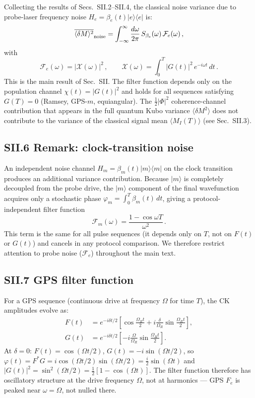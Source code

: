 \documentclass[aps,pra,twocolumn,superscriptaddress,longbibliography]{revtex4-2}
\newcommand{\be}{\begin{equation}}
\newcommand{\ee}{\end{equation}}
\begin{document}
Collecting the results of Secs.~SII.2--SII.4, the classical noise variance due to
probe-laser frequency noise $H_e = \beta_e(t)|e\rangle\langle e|$ is:
\be
  \overline{\langle\delta M\rangle^2}_{\rm noise}
  = \int_{-\infty}^{\infty}\frac{d\omega}{2\pi}\,
    S_{\beta_e}(\omega)\,\mathcal{F}_e(\omega)\,,
  \label{eq:full_var_supp}
\ee
with
\be
  \boxed{\mathcal{F}_e(\omega) = |\mathcal{X}(\omega)|^2\,,
  \qquad \mathcal{X}(\omega) = \int_0^T|G(t)|^2\,e^{-i\omega t}\,dt\,.}
  \label{eq:Fe_3level_supp}
\ee
This is the main result of Sec.~SII.
The filter function depends only on the population channel $\chi(t)=|G(t)|^2$
and holds for all sequences satisfying $G(T)=0$ (Ramsey, GPS-$m$, equiangular).
The $\tfrac{1}{2}|\Phi|^2$ coherence-channel contribution that appears in the
full quantum Kubo variance $\langle\delta M^2\rangle$ does not contribute to the
variance of the classical signal mean $\langle M_I(T)\rangle$ (see Sec.~SII.3).

\subsection*{SII.6 Remark: clock-transition noise}

An independent noise channel $H_m = \beta_m(t)|m\rangle\langle m|$ on the clock
transition produces an additional variance contribution.
Because $|m\rangle$ is completely decoupled from the probe drive, the
$|m\rangle$ component of the final wavefunction acquires only a stochastic phase
$\varphi_m = \int_0^T\!\beta_m(t)\,dt$, giving a protocol-independent filter function
\be
  \mathcal{F}_m(\omega) = \frac{1-\cos\omega T}{\omega^2}\,.
  \label{eq:Fm_supp}
\ee
This term is the same for all pulse sequences (it depends only on $T$, not on $F(t)$
or $G(t)$) and cancels in any protocol comparison.
We therefore restrict attention to probe noise ($\mathcal{F}_e$) throughout the main text.

\subsection*{SII.7 GPS filter function}

For a GPS sequence (continuous drive at frequency $\Omega$ for time $T$), the CK
amplitudes evolve as:
\begin{align}
  F(t) &= e^{-i\delta t/2}\!\left[\cos\!\tfrac{\Omega_R t}{2}
           + i\tfrac{\delta}{\Omega_R}\sin\!\tfrac{\Omega_R t}{2}\right], \\
  G(t) &= e^{-i\delta t/2}\!\left[-i\tfrac{\Omega}{\Omega_R}\sin\!\tfrac{\Omega_R t}{2}\right].
\end{align}
At $\delta = 0$: $F(t) = \cos(\Omega t/2)$, $G(t) = -i\sin(\Omega t/2)$, so
$\varphi(t) = F^*G = i\cos(\Omega t/2)\sin(\Omega t/2) = \tfrac{i}{2}\sin(\Omega t)$
and $|G(t)|^2 = \sin^2(\Omega t/2) = \tfrac{1}{2}[1-\cos(\Omega t)]$.
The filter function therefore has oscillatory structure at the drive frequency $\Omega$,
not at harmonics — GPS $F_e$ is peaked near $\omega = \Omega$, not nulled there.
\end{document}
